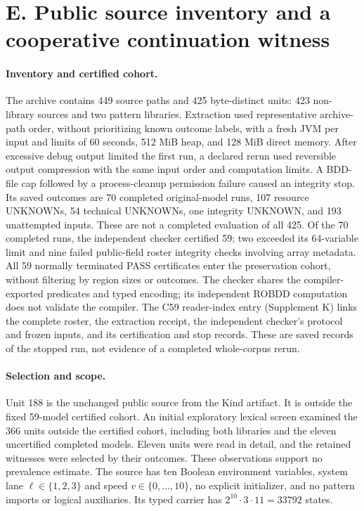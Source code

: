 \section*{E. Public source inventory and a cooperative continuation witness}
\paragraph{Inventory and certified cohort.}
The archive contains 449 source paths and 425 byte-distinct units:
423 non-library sources and two pattern libraries. Extraction used
representative archive-path order, without prioritizing known outcome
labels, with a fresh JVM per input and limits of 60 seconds, 512 MiB
heap, and 128 MiB direct memory. After excessive debug output limited
the first run, a declared rerun used reversible output compression with
the same input order and computation limits. A BDD-file cap followed by
a process-cleanup permission failure caused an integrity stop.
Its saved outcomes are 70 completed original-model runs, 107 resource
UNKNOWNs, 54 technical UNKNOWNs, one integrity UNKNOWN, and 193
unattempted inputs. These are not a completed evaluation of all 425.
Of the 70 completed runs, the independent checker certified 59;
two exceeded its 64-variable limit and nine failed public-field roster
integrity checks involving array metadata. All 59 normally terminated PASS certificates enter
the preservation cohort, without filtering by region sizes or outcomes.
The checker shares the compiler-exported predicates and typed encoding;
its independent ROBDD computation does not validate the compiler.
The C59 reader-index entry (Supplement K) links the complete roster,
the extraction receipt, the independent checker's protocol and frozen
inputs, and its certification and stop records. These are saved records
of the stopped run, not evidence of a completed whole-corpus rerun.

\paragraph{Selection and scope.}
Unit 188 is the unchanged public source
from the Kind artifact. It is outside the fixed 59-model certified cohort.
An initial exploratory lexical screen examined the 366 units outside
the certified cohort, including both libraries and the eleven
uncertified completed models.
Eleven units were read in detail, and the retained witnesses were selected
by their outcomes. These observations support no prevalence estimate.
The source has ten Boolean environment variables, system lane
$\ell\in\{1,2,3\}$ and speed $v\in\{0,\ldots,10\}$, no explicit
initializer, and no pattern imports or logical auxiliaries.
Its typed carrier has $2^{10}\cdot3\cdot11=33792$ states.

